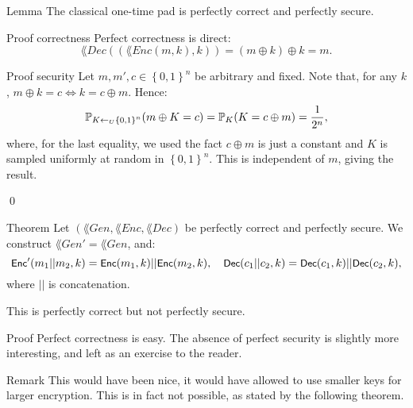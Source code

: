 \documentclass[a4paper]{article}
\begin{document}
\begin{parag}{Lemma}
    The classical one-time pad is perfectly correct and perfectly secure.

    \begin{subparag}{Proof correctness}
        Perfect correctness is direct:
        \[\lang{Dec}\left(\left(\lang{Enc}\left(m, k\right), k\right)\right) = \left(m \oplus k\right) \oplus k = m.\]
    \end{subparag}

    \begin{subparag}{Proof security}
        Let $m, m', c \in \left\{0, 1\right\}^n$ be arbitrary and fixed.  Note that, for any $k$, $m \oplus k = c \iff k = c \oplus m$. Hence: 
        \[\prob_{K \leftarrow_U \left\{0, 1\right\}^n}\left(m \oplus K = c\right) = \prob_K\left(K = c \oplus m\right) = \frac{1}{2^n},\]
        where, for the last equality, we used the fact $c \oplus m$ is just a constant and $K$ is sampled uniformly at random in $\left\{0, 1\right\}^n$. This is independent of $m$, giving the result.

        \qed
    \end{subparag}
\end{parag}

\begin{parag}{Theorem}
    Let $\left(\lang{Gen}, \lang{Enc}, \lang{Dec}\right)$ be perfectly correct and perfectly secure. We construct $\lang{Gen}' = \lang{Gen}$, and:
    \[\lang{Enc}'\left(m_1 || m_2, k\right) = \lang{Enc}\left(m_1, k\right) || \lang{Enc}\left(m_2, k\right), \mathspace \lang{Dec}\left(c_1 || c_2, k\right) = \lang{Dec}\left(c_1, k\right) || \lang{Dec}\left(c_2, k\right),\]
    where $||$ is concatenation.

    This is perfectly correct but not perfectly secure.

    \begin{subparag}{Proof}
        Perfect correctness is easy. The absence of perfect security is slightly more interesting, and left as an exercise to the reader.
    \end{subparag}

    \begin{subparag}{Remark}
        This would have been nice, it would have allowed to use smaller keys for larger encryption. This is in fact not possible, as stated by the following theorem.
    \end{subparag}
\end{parag}
\end{document}
